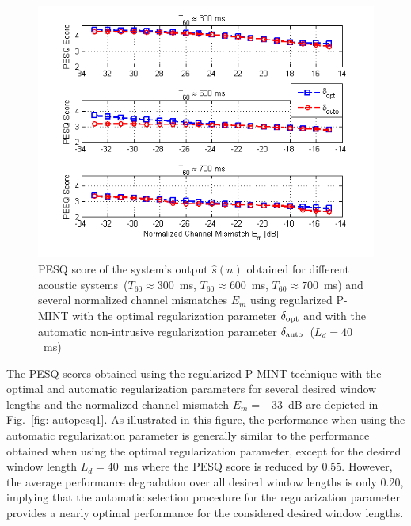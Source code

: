 \documentclass[10pt]{IEEEtran}
\begin{document}
\begin{figure}[b!]
\centering
\includegraphics[scale = 0.65]{Plots/PESQ_optandautofixed_Ld_640}
\caption{PESQ score of the system's output $\hat{s}(n)$ obtained for different acoustic systems~($T_{60} \approx 300$~ms, $T_{60} \approx 600$~ms, $T_{60} \approx 700$~ms) and several normalized channel mismatches $E_m$ using regularized P-MINT with the optimal regularization parameter $\delta_{\rm opt}$ and with the automatic non-intrusive regularization parameter $\delta_{\rm auto}$~($L_d = 40$~ms)}
\label{fig: autopesq2}
\end{figure}

The PESQ scores obtained using the regularized P-MINT technique with the optimal and automatic regularization parameters for several desired window lengths and the normalized channel mismatch $E_m = -33$~dB are depicted in Fig.~\ref{fig: autopesq1}.
As illustrated in this figure, the performance when using the automatic regularization parameter is generally similar to the performance obtained when using the optimal regularization parameter, except for the desired window length $L_d = 40$~ms where the PESQ score is reduced by $0.55$.
However, the average performance degradation over all desired window lengths is only $0.20$, implying that the automatic selection procedure for the regularization parameter provides a nearly optimal performance for the considered desired window lengths.
\end{document}

